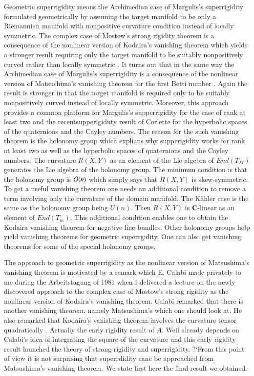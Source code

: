 Geometric superrigidity means the Archimedian case of Margulis's superrigidity \cite{art16-keyMar} formulated geometrically by assuming the target manifold to be only a Riemannian manifold with nonpositive curvature condition instead of locally symmetric. The complex case of Mostow's strong rigidity theorem \cite{art16-keyMos} is a consequence of the nonlinear version of Kodaira's vanishing theorem which yields a stronger result requiring only the target manifold to be suitably nonpositively curved rather than locally symmetric \cite{art16-keySi}. It turns out that in the same way the Archimedian case of Margulis's superrigidity is a consequence of the nonlinear version of Matsushima's vanishing theorem for the first Betti number \cite{art16-keyMat}. Again the result is stronger in that the target manifold is required only to be suitably nonpositively curved instead of locally symmetric. Moreover, this approach provides a common platform for Margulis's supperrigidity for the case of rank at least two and the recentsupperigiduty result of Corlette \cite{art16-keyCo} for the hyperbolic spaces of the quaternions and the Cayley numbers. The reason for the such vanishing theorem is the holonomy group which explians why supperigidity works for rank at least two as well as the hyperbolic spaces of quaternions and the Cayley numbers. The curvature $R(X, Y)$ as an element of the Lie algebra of $End(T_{M})$ generates the Lie algebra of the holonomy group. The minimum condition is that the holonomy group is $\mathcal{O}(n)$ which simply says that $R(X, Y)$ is skew-symmetric. To get a useful vanishing theorem one needs an additional condition to remove a term involving only the curvature of the domain manifold. The K\"ahler case is the same as the holonomy group being $U(n)$. Then $R(X, Y)$ is $\mathbf{C}$-linear as an element of $End(T_{m})$. This additional condition enables one to obtain the Kodaira vanishing theorem for negative line bundles. Other holonomy groups help yield vanishing theorems for geometric superrgidity. One can also get vanishing theorems for some of the special holonomy groups.

The approach to geometric superrigidity as the nonlinear version of Matsushima's vanishing theorem is motivated by a remark which E.  Calabi made privately to me during the Arbeitstagung of 1981 when I delivered a lecture on the newly discovered approach to the complex case of Mostow's strong rigidity as the nonlinear version of Kodaira's vanishing theorem. Calabi remarked that there is another vanishing theorem, namely Matsushima's which one should look at. He also remarked that Kodaira's vanishing theorem involves the curvature tensor quadratically \cite{art16-keyCa}. Actually the early rigidity result of $A$. Weil \cite{art16-keyW} already depends on Calabi's idea of integrating the square of the curvature\pageoriginale \cite[p. 316]{art16-keyMat} and this early rigidity result launched the theory of strong rigidity and superrigidity. ?`From this point of view it is not surprising that superrdidity cane be approached from Matsushima's vanishing theorem. We state first here the final result we obtained.

